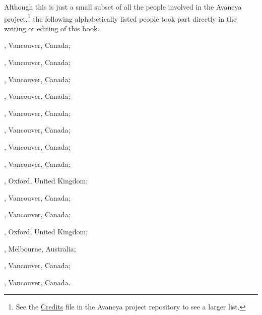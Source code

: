 

Although this is just a small subset of all the people involved in the Avaneya project,\footnote{See the \href{https://bazaar.launchpad.net/~avaneya/avaneya/trunk/view/head:/Credits}{Credits} file in the Avaneya project repository to see a larger list.} the following alphabetically listed people took part directly in the writing or editing of this book.


\startitemize[joinedup]
\item {}, Vancouver, Canada;
\item {}, Vancouver, Canada;
\item {}, Vancouver, Canada;
\item {}, Vancouver, Canada;
\item {}, Vancouver, Canada;
\item {}, Vancouver, Canada;
\item {}, Vancouver, Canada;
\item {}, Vancouver, Canada;
\item {}, Oxford, United Kingdom;
\item {}, Vancouver, Canada;
\stopitemize


\startitemize[joinedup]
\item {}, Vancouver, Canada;
\item {}, Oxford, United Kingdom;
\stopitemize


\startitemize[joinedup]
\item {}, Melbourne, Australia;
\item {}, Vancouver, Canada;
\stopitemize


\startitemize[joinedup]
\item {}, Vancouver, Canada.
\stopitemize

\StopChapter


